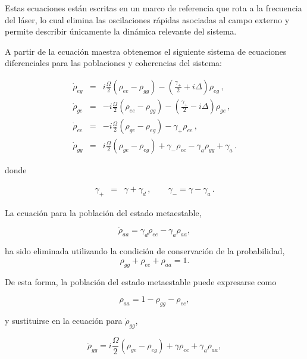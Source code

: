 \documentclass[12pt]{article}
\begin{document}
Estas ecuaciones están escritas en un marco de referencia que rota a la frecuencia del láser, lo cual elimina las oscilaciones rápidas asociadas al campo externo y permite describir únicamente la dinámica relevante del sistema.

A partir de la ecuación maestra obtenemos el siguiente sistema de ecuaciones diferenciales para las poblaciones y coherencias del sistema:

\begin{eqnarray} 	\label{eq:dotrho_jk}
\dot{\rho}_{eg} &=& i\frac{\Omega}{2} (\rho_{ee} -\rho_{gg})
 -\left( \frac{\gamma_+}{2}  +i\Delta \right) \rho_{eg} \,, \\
%
\dot{\rho}_{ge} &=& -i\frac{\Omega}{2} (\rho_{ee} -\rho_{gg})
 -\left( \frac{\gamma_+}{2}  -i\Delta \right) \rho_{ge} \,,
 	\nonumber 	\\
%
\dot{\rho}_{ee} &=& -i\frac{\Omega}{2} (\rho_{ge} -\rho_{eg})
 	-\gamma_+ \rho_{ee} \,,	\nonumber 	\\
%
\dot{\rho}_{gg} &=& i\frac{\Omega}{2} (\rho_{ge} -\rho_{eg})
	+\gamma_- \rho_{ee} -\gamma_a \rho_{gg}
	+\gamma_a \,.	 	\nonumber
\end{eqnarray}

donde

\begin{eqnarray}
\gamma_+ &=& \gamma + \gamma_d \,, \qquad
\gamma_- = \gamma - \gamma_a \,.
\end{eqnarray}

La ecuación para la población del estado metaestable,

\begin{equation}
\dot{\rho}_{aa} = \gamma_d \rho_{ee} - \gamma_a \rho_{aa},
\end{equation}

ha sido eliminada utilizando la condición de conservación de la probabilidad,
\begin{equation}
\rho_{gg}+\rho_{ee}+\rho_{aa}=1.
\end{equation}

De esta forma, la población del estado metaestable puede expresarse como

\begin{equation}
\rho_{aa}=1-\rho_{gg}-\rho_{ee},
\end{equation}

y sustituirse en la ecuación para $\dot{\rho}_{gg}$,

\begin{equation}
\dot{\rho}_{gg}
=
i\frac{\Omega}{2}(\rho_{ge}-\rho_{eg})
+\gamma\rho_{ee}
+\gamma_a\rho_{aa},
\end{equation}
\end{document}
